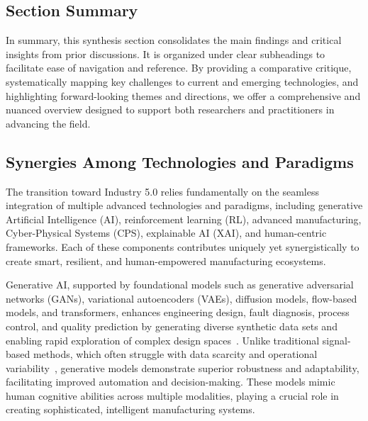 \documentclass[sigconf]{acmart}
\begin{document}
\subsection{Section Summary}
In summary, this synthesis section consolidates the main findings and critical insights from prior discussions. It is organized under clear subheadings to facilitate ease of navigation and reference. By providing a comparative critique, systematically mapping key challenges to current and emerging technologies, and highlighting forward-looking themes and directions, we offer a comprehensive and nuanced overview designed to support both researchers and practitioners in advancing the field.

\subsection{Synergies Among Technologies and Paradigms}

The transition toward Industry 5.0 relies fundamentally on the seamless integration of multiple advanced technologies and paradigms, including generative Artificial Intelligence (AI), reinforcement learning (RL), advanced manufacturing, Cyber-Physical Systems (CPS), explainable AI (XAI), and human-centric frameworks. Each of these components contributes uniquely yet synergistically to create smart, resilient, and human-empowered manufacturing ecosystems.

Generative AI, supported by foundational models such as generative adversarial networks (GANs), variational autoencoders (VAEs), diffusion models, flow-based models, and transformers, enhances engineering design, fault diagnosis, process control, and quality prediction by generating diverse synthetic data sets and enabling rapid exploration of complex design spaces~\cite{ref1}. Unlike traditional signal-based methods, which often struggle with data scarcity and operational variability~\cite{ref4}, generative models demonstrate superior robustness and adaptability, facilitating improved automation and decision-making. These models mimic human cognitive abilities across multiple modalities, playing a crucial role in creating sophisticated, intelligent manufacturing systems.
\end{document}
